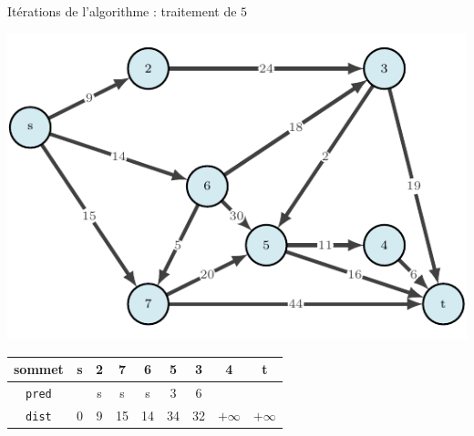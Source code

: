 \begin{frame}{Itérations de l'algorithme : traitement de $5$}
    \begin{center}
        \includegraphics[height=.6\textheight]{fig/ordinal-0.pdf}      
    \begin{tabular}{c|cccccccc}
        
        sommet & s       &2      &7      &6      &5      &3      &4      &t      \\
        \hline
        \texttt{pred} & &s      &s      &s      &3      &6      &       &       \\
        \texttt{dist} & 0       &9      &15     &14     &34     &32     &$+\infty$    &$+\infty$    \\
    \end{tabular}
\end{center}
\end{frame}


